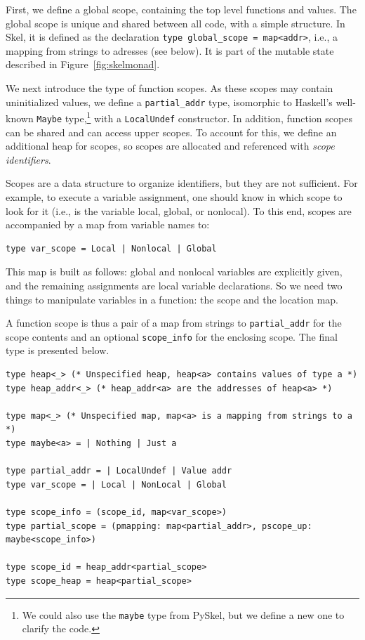 \documentclass[submission,copyright,creativecommons]{eptcs}
\newcommand{\skinl}[1]{\texttt{#1}}
\newcommand{\asi}[1]{\todo[color=blue!30,inline]{#1}}
\begin{document}
First, we define a global scope, containing the top level functions and values.
The global scope is unique and shared between all code, with a simple structure.
In Skel, it is defined as the declaration \texttt{type global_scope = map<addr>}, i.e., a mapping from strings
to adresses (see below).
It is part of the mutable state described in Figure~\ref{fig:skelmonad}.

We next introduce the type of function scopes.
As these scopes may contain uninitialized values, we define a
\texttt{partial_addr} type, isomorphic to Haskell's well-known \texttt{Maybe}
type,\footnote{We could also use the \texttt{maybe} type from PySkel, but we define a new one to clarify the code.} with a \texttt{LocalUndef} constructor.
In addition, function scopes can be shared and can access upper scopes.
To account for this, we define an additional heap for scopes, so scopes are allocated and
referenced with \emph{scope identifiers}.

Scopes are a data structure to organize identifiers, but they are not sufficient.
For example, to execute a variable assignment, one should know in which scope to look for it (i.e., is the variable local, global, or nonlocal).
To this end, scopes are accompanied by a map from variable names
to:
\begin{verbatim}
type var_scope = Local | Nonlocal | Global
\end{verbatim}
This map is built as follows: global and nonlocal variables are explicitly given, and the remaining
assignments are local variable declarations.
So we need two things to manipulate variables in a function: the scope and the location map.

A function scope is thus a pair of a map from strings to \skinl{partial_addr}
for the scope contents and an optional \skinl{scope_info} for the enclosing scope.
The final type is presented below.
\begin{verbatim}
type heap<_> (* Unspecified heap, heap<a> contains values of type a *)
type heap_addr<_> (* heap_addr<a> are the addresses of heap<a> *)

type map<_> (* Unspecified map, map<a> is a mapping from strings to a *)
type maybe<a> = | Nothing | Just a

type partial_addr = | LocalUndef | Value addr
type var_scope = | Local | NonLocal | Global

type scope_info = (scope_id, map<var_scope>)
type partial_scope = (pmapping: map<partial_addr>, pscope_up: maybe<scope_info>)

type scope_id = heap_addr<partial_scope>
type scope_heap = heap<partial_scope>
\end{verbatim}
\end{document}
